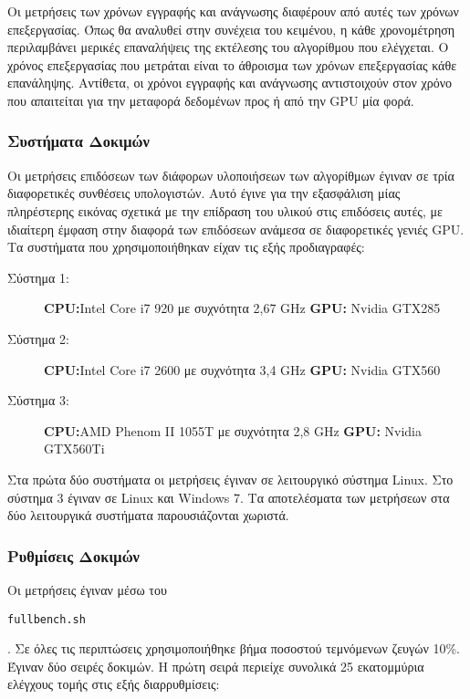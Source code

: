 Οι μετρήσεις των χρόνων εγγραφής και ανάγνωσης διαφέρουν από αυτές των χρόνων επεξεργασίας. Όπως θα αναλυθεί στην συνέχεια του κειμένου, η κάθε χρονομέτρηση περιλαμβάνει μερικές επαναλήψεις της εκτέλεσης του αλγορίθμου που ελέγχεται. Ο χρόνος επεξεργασίας που μετράται είναι το άθροισμα των χρόνων επεξεργασίας κάθε επανάληψης. Αντίθετα, οι χρόνοι εγγραφής και ανάγνωσης αντιστοιχούν στον χρόνο που απαιτείται για την μεταφορά δεδομένων προς ή από την GPU μία φορά.   

\subsubsection*{Συστήματα Δοκιμών}

Οι μετρήσεις επιδόσεων των διάφορων υλοποιήσεων των αλγορίθμων έγιναν σε τρία διαφορετικές συνθέσεις υπολογιστών. Αυτό έγινε για την εξασφάλιση μίας πληρέστερης εικόνας σχετικά με την επίδραση του υλικού στις επιδόσεις αυτές, με ιδιαίτερη έμφαση στην διαφορά των επιδόσεων ανάμεσα σε διαφορετικές γενιές GPU. Τα συστήματα που χρησιμοποιήθηκαν είχαν τις εξής προδιαγραφές:

\begin{description}
  \item[Σύστημα 1:]\textbf{CPU:}Intel Core i7 920 με συχνότητα 2,67 GHz \textbf{GPU:} Nvidia GTX285 %
  \item[Σύστημα 2:]\textbf{CPU:}Intel Core i7 2600 με συχνότητα 3,4 GHz \textbf{GPU:} Nvidia GTX560 %
  \item[Σύστημα 3:]\textbf{CPU:}AMD Phenom II 1055T με συχνότητα 2,8 GHz \textbf{GPU:} Nvidia GTX560Ti %
\end{description}

Στα πρώτα δύο συστήματα οι μετρήσεις έγιναν σε λειτουργικό σύστημα Linux. Στο σύστημα 3 έγιναν σε Linux και Windows 7. Τα αποτελέσματα των μετρήσεων στα δύο λειτουργικά συστήματα παρουσιάζονται χωριστά.

\subsubsection*{Ρυθμίσεις Δοκιμών}

Οι μετρήσεις έγιναν μέσω του \begin{english}\verb!fullbench.sh!\end{english}. Σε όλες τις περιπτώσεις χρησιμοποιήθηκε βήμα ποσοστού τεμνόμενων ζευγών 10\%. Έγιναν δύο σειρές δοκιμών. Η πρώτη σειρά περιείχε συνολικά 25 εκατομμύρια ελέγχους τομής στις εξής διαρρυθμίσεις:

